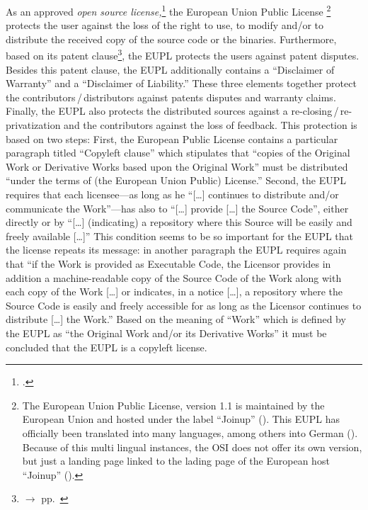 As an approved \emph{open source license,}\footcite[cf.][\nopage wp]{OSI2012b}
the European Union Public License%
  \footnote{The European Union Public License, version 1.1 is maintained by the
  European Union and hosted under the label \enquote{Joinup} 
  (\cite[cf.][\nopage wp]{EuplLicense2007en}).  This EUPL has officially been
  translated into many languages, among others into German 
  (\cite[cf.][\nopage wp]{EuplLicense2007de}). Because of this multi lingual
  instances, the OSI does not offer its own version, but just a landing page
  linked to the lading page of the European host \enquote{Joinup} 
  (\cite[cf.][\nopage wp]{Eupl11OsiLicense2007a}).} 
protects the user against the loss of the right to use, to modify and/or to
distribute the received copy of the source code or the binaries.
Furthermore, based on its patent clause\footnote{$\rightarrow$ \oslic{}
pp.\ }, the EUPL protects the users against
patent disputes. Besides this patent clause, the EUPL
additionally contains a \enquote{Disclaimer of Warranty} and a
\enquote{Disclaimer of Liability.} These three elements
together protect the contributors\,/\,distributors against patents disputes and
warranty claims. Finally, the EUPL also protects the distributed sources against
a re-closing\,/\,re-privatization and the contributors against the loss of
feedback. This protection is based on two steps: First, the European Public
License contains a particular paragraph titled \enquote{Copyleft clause} which
stipulates that \enquote{copies of the Original Work or Derivative Works based
upon the Original Work} must be distributed \enquote{under the terms of (the
European Union Public) License.} Second, the EUPL requires that
each licensee---as long as he \enquote{[\ldots] continues to distribute and/or
communicate the Work}---has also to \enquote{[\ldots] provide [\ldots] the
Source Code}, either directly or by \enquote{[\ldots] (indicating) 
a repository where this Source will be easily and freely available
[\ldots]} This condition seems to be so important for the EUPL that
the license repeats its message: in another paragraph the EUPL requires again
that \enquote{if the Work is provided as Executable Code, the Licensor provides
in addition a machine-readable copy of the Source Code of the Work along with
each copy of the Work [\ldots] or indicates, in a notice [\ldots], a repository
where the Source Code is easily and freely accessible for as long as the
Licensor continues to distribute [\ldots] the Work.} Based on 
the meaning of \enquote{Work} which is defined by the EUPL as \enquote{the
Original Work and/or its Derivative Works} it must be concluded
that the EUPL is a copyleft license. 

